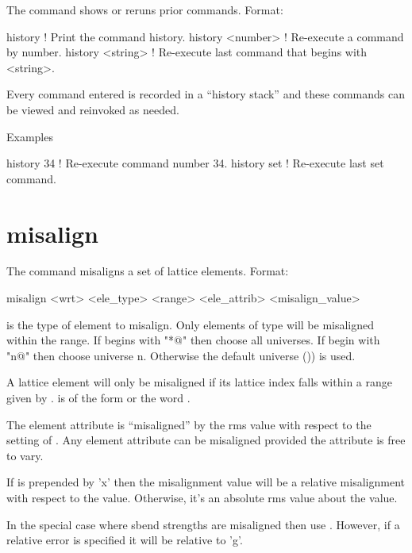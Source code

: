 The  command shows or reruns prior commands.  Format:
\begin{example}
  history           ! Print the command history.
  history <number>  ! Re-execute a command by number.
  history <string>  ! Re-execute last command that begins with <string>.
\end{example}

\vskip 0.2in
Every \tao command entered is recorded in a ``history stack'' and
these commands can be viewed and reinvoked as needed. 

Examples
\begin{example}
  history 34   ! Re-execute command number 34.
  history set  ! Re-execute last set command.  
\end{example}

\section{misalign}
\label{s:misalign}

The  command misaligns a set of lattice elements. Format:
\begin{example}
   misalign <wrt> <ele_type> <range> <ele_attrib> <misalign_value>
\end{example}

\vskip 0.2in 

 is the type of element to misalign.  Only
elements of type  will be misaligned within the range.
If  begins with "*@" then choose all universes. If
 begin with "n@" then choose universe n. Otherwise the
default universe ()) is used.

A lattice element will only be misaligned if its lattice index falls within
a range given by .  is of the form
 or the word . 

The element attribute  is ``misaligned'' by the rms
value  with respect to the setting of
. Any element attribute can be misaligned provided the
attribute is free to vary.

If  is prepended by 'x' then the misalignment value will be
a relative misalignment with respect to the  value. Otherwise, it's an 
absolute rms value about the  value.

In the special case where sbend strengths are misaligned then use
. However, if a relative error is specified it will be 
relative to 'g'.

